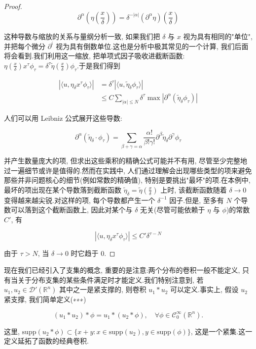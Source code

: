 \begin{proof}
\[
\partial^{\alpha}\left(\eta\left(\frac{x}{\delta}\right)\right) = \delta^{-|\alpha|}(\partial^{\alpha}\eta)\left(\frac{x}{\delta}\right)
\]

这种导数与缩放的关系与量纲分析一致, 如果我们把 $\delta$ 与 $x$ 视为具有相同的"单位", 并把每个微分 $\partial^i$ 视为具有倒数单位.这也是分析中极其常见的一个计算, 我们后面将会看到.我们利用这一缩放, 把单项式因子吸收进截断函数:$\eta(\frac{x}{\delta})x^{\tau}\phi_{\tau} = \delta^{\tau}\tilde{\eta}(\frac{x}{\delta})\phi_{\tau}$.于是我们得到

\[
\begin{aligned}
|\langle u, \eta_{\delta}x^{\tau}\phi_{\tau}\rangle| &= \delta^{\tau}|\langle u, \tilde{\eta}_{\delta}\phi_{\tau}\rangle| \\
&\leq C\sum_{|\alpha|\leq N}\delta^{\tau}\max|\partial^{\alpha}(\tilde{\eta}_{\delta}\phi_{\tau})|
\end{aligned}
\]

人们可以用 Leibniz 公式展开这些导数:

\[
\partial^{\alpha}(\tilde{\eta}_{\delta}\cdot\phi_{\tau}) = \sum_{\beta+\gamma=\alpha}\frac{\alpha!}{\beta!\gamma!}\partial^{\beta}\tilde{\eta}_{\delta}\partial^{\gamma}\phi_{\tau}
\]

并产生数量庞大的项, 但求出这些乘积的精确公式可能并不有用, 尽管至少完整地过一遍细节或许是值得的.然而在实践中, 人们通过理解会出现哪些类型的项来避免那些并非问题核心的细节(例如常数的精确值), 特别是要挑出"最坏"的项.在本例中, 最坏的项出现在某个导数落到截断函数 $\tilde{\eta}_{\delta} = \tilde{\eta}(\frac{x}{\delta})$ 上时, 该截断函数随着 $\delta\to 0$ 变得越来越尖锐.对这样的项, 每个导数都产生一个 $\delta^{-1}$ 因子.但是, 至多有 $N$ 个导数可以落到这个截断函数上, 因此对某个与 $\delta$ 无关(尽管可能依赖于 $\eta$ 与 $\phi$)的常数 $C'$, 有

\[
|\langle u, \eta_{\delta}x^{\tau}\phi_{\tau}\rangle|\leq C'\delta^{\tau-N}
\]

由于 $\tau>N$, 当 $\delta\to 0$ 时它趋于 0.
\end{proof}

现在我们已经引入了支集的概念, 重要的是注意:两个分布的卷积一般不能定义, 只有当关于分布支集的某些条件满足时才能定义.我们特别注意到, 若 $u_1, u_2\in\mathcal{D}'(\mathbb{R}^n)$ 其中之一是紧支撑的, 则卷积 $u_1*u_2$ 可以定义.事实上, 假设 $u_2$ 紧支撑, 我们简单定义(∗∗∗)

\[
(u_1*u_2)*\phi = u_1*(u_2*\phi), \quad \forall\phi\in\mathcal{C}_0^{\infty}(\mathbb{R}^n).
\]

这里, $\mathrm{supp}(u_2*\phi)\subset\{x+y : x\in\mathrm{supp}(u_2), y\in\mathrm{supp}(\phi)\}$, 这是一个紧集.这一定义延拓了函数的经典卷积.

